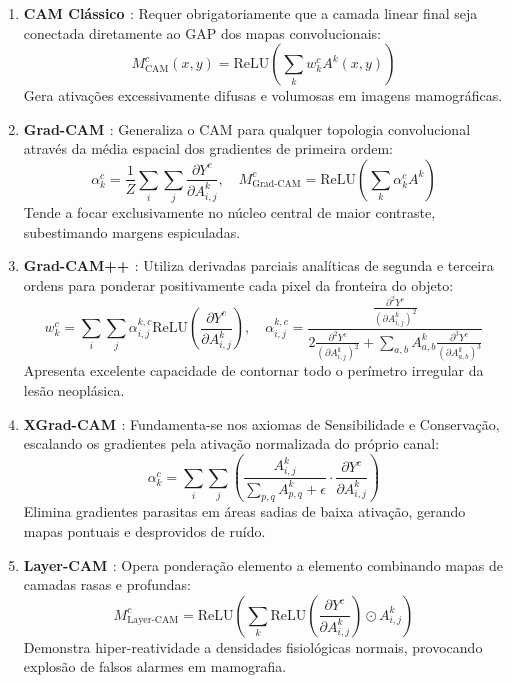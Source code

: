 \documentclass[12pt]{article}
\begin{document}
\begin{enumerate}
    \item \textbf{CAM Clássico \cite{zhou2016learning}}: Requer obrigatoriamente que a camada linear final seja conectada diretamente ao GAP dos mapas convolucionais:
    \begin{equation}
    M_{\text{CAM}}^c(x, y) = \text{ReLU}\left( \sum_k w_k^c A^k(x, y) \right)
    \end{equation}
    Gera ativações excessivamente difusas e volumosas em imagens mamográficas.

    \item \textbf{Grad-CAM \cite{selvaraju2017grad}}: Generaliza o CAM para qualquer topologia convolucional através da média espacial dos gradientes de primeira ordem:
    \begin{equation}
    \alpha_k^c = \frac{1}{Z} \sum_{i} \sum_{j} \frac{\partial Y^c}{\partial A_{i,j}^k}, \quad M_{\text{Grad-CAM}}^c = \text{ReLU}\left( \sum_k \alpha_k^c A^k \right)
    \end{equation}
    Tende a focar exclusivamente no núcleo central de maior contraste, subestimando margens espiculadas.

    \item \textbf{Grad-CAM++ \cite{chattopadhay2018grad}}: Utiliza derivadas parciais analíticas de segunda e terceira ordens para ponderar positivamente cada pixel da fronteira do objeto:
    \begin{equation}
    w_k^c = \sum_i \sum_j \alpha_{i,j}^{k,c} \text{ReLU}\left( \frac{\partial Y^c}{\partial A_{i,j}^k} \right), \quad \alpha_{i,j}^{k,c} = \frac{\frac{\partial^2 Y^c}{(\partial A_{i,j}^k)^2}}{2 \frac{\partial^2 Y^c}{(\partial A_{i,j}^k)^2} + \sum_{a,b} A_{a,b}^k \frac{\partial^3 Y^c}{(\partial A_{a,b}^k)^3}}
    \end{equation}
    Apresenta excelente capacidade de contornar todo o perímetro irregular da lesão neoplásica.

    \item \textbf{XGrad-CAM \cite{fu2020axiom}}: Fundamenta-se nos axiomas de Sensibilidade e Conservação, escalando os gradientes pela ativação normalizada do próprio canal:
    \begin{equation}
    \alpha_k^c = \sum_i \sum_j \left( \frac{A_{i,j}^k}{\sum_{p,q} A_{p,q}^k + \epsilon} \cdot \frac{\partial Y^c}{\partial A_{i,j}^k} \right)
    \end{equation}
    Elimina gradientes parasitas em áreas sadias de baixa ativação, gerando mapas pontuais e desprovidos de ruído.

    \item \textbf{Layer-CAM \cite{jiang2021layercam}}: Opera ponderação elemento a elemento combinando mapas de camadas rasas e profundas:
    \begin{equation}
    M_{\text{Layer-CAM}}^c = \text{ReLU}\left( \sum_k \text{ReLU}\left(\frac{\partial Y^c}{\partial A_{i,j}^k}\right) \odot A_{i,j}^k \right)
    \end{equation}
    Demonstra hiper-reatividade a densidades fisiológicas normais, provocando explosão de falsos alarmes em mamografia.
\end{enumerate}
\end{document}
